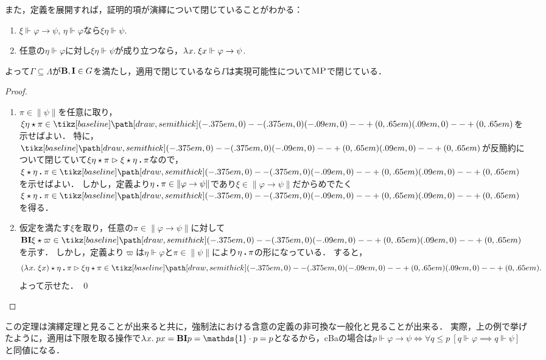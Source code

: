 \documentclass[realisability.tex]{subfiles}
\begin{document}
また，定義を展開すれば，証明的項が演繹について閉じていることがわかる：
\begin{lemma}[演繹定理]
 \begin{enumerate}
  \item $\xi \Vdash \varphi \to \psi$, $\eta \Vdash \varphi$なら$\xi\eta \Vdash \psi$.
  \item 任意の$\eta \Vdash \varphi$に対し$\xi \eta \Vdash \psi$が成り立つなら，$\lambda^{\mathsf{}}x.\;\xi x \Vdash \varphi \to \psi$.
 \end{enumerate}
 よって$\Gamma \subseteq \Lambda$が$\mathsf{\mathbf{B}}, \mathsf{\mathbf{I}} \in G$を満たし，適用で閉じているなら$\Gamma$は実現可能性について$\mathord{\textsc{MP}}$で閉じている．
\end{lemma}
\begin{proof}
 \begin{enumerate}
  \item $\pi \in \|\psi\|$を任意に取り，$\xi \eta \cons \pi \in \pole$を示せばよい．
        特に，$\pole$が反簡約について閉じていて$\xi\eta \mathbin{\star} \pi \mathrel{\rhd} \xi \mathbin{\star} \eta \mathbin{\boldsymbol{.}} \pi$なので，$\xi \cons \eta \push \pi \in \pole$を示せばよい．
        しかし，定義より$\eta \mathbin{\boldsymbol{.}} \pi \in \|\varphi \to \psi\|$であり$\xi \in \|\varphi \to \psi\|$だからめでたく$\xi \cons \eta \push \pi \in \pole$を得る．
  \item 仮定を満たす$\xi$を取り，任意の$\pi \in \|\varphi \to \psi\|$に対して$\B\I\xi \cons \varpi \in \pole$を示す．
        しかし，定義より$\varpi$は$\eta \Vdash \varphi$と$\pi \in \|\psi\|$により$\eta \mathbin{\boldsymbol{.}} \pi$の形になっている．
        すると，
        \[
         (\abs{x}{\xi x}) \cons \eta \push \pi
        \rhd \xi \eta \cons \pi \in \pole.
        \]
        よって示せた． \qed
 \end{enumerate}
\end{proof}
この定理は演繹定理と見ることが出来ると共に，強制法における含意の定義の非可換な一般化と見ることが出来る．
実際，上の例で挙げたように，適用は下限を取る操作で$\abs{x}{p x} = \B \I p = \mathds{1} \cdot p = p$となるから，cBaの場合は$p \Vdash \varphi \to \psi \iff \forall q \leq p \: [q \Vdash \varphi \implies q \Vdash \psi]$と同値になる．
\end{document}
